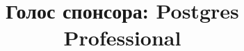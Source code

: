 \documentclass[10pt, a5paper]{article}
\begin{document}
\title{Голос спонсора: Postgres Professional}
\date{}
\maketitle

~

\newpage

~
\end{document}
